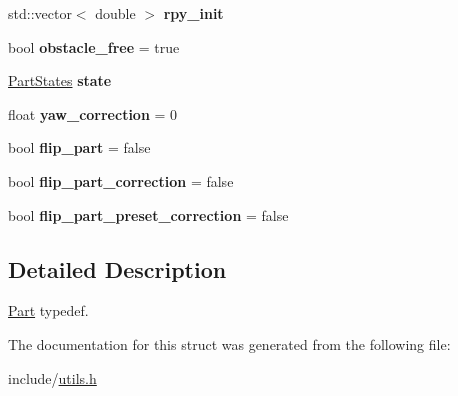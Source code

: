 \begin{DoxyCompactItemize}
\mbox{\label{structPart_a3765b86daac903e72665835d3b5d161c}} 
std\+::vector$<$ double $>$ {\bfseries rpy\+\_\+init}
\item 
\mbox{\label{structPart_a04fb40a72118482392aa85f3d32d81d7}} 
bool {\bfseries obstacle\+\_\+free} = true
\item 
\mbox{\label{structPart_a3d0424b1b6ad362298da16ada9c60959}} 
\hyperlink{utils_8h_aaf7e202ccc2e0bac6d05d124e49b11d3}{Part\+States} {\bfseries state}
\item 
\mbox{\label{structPart_a4cd35c6e6cc7bbf220efb3d44cd507ff}} 
float {\bfseries yaw\+\_\+correction} = 0
\item 
\mbox{\label{structPart_a95405a938a218baa4190e372b5ef593d}} 
bool {\bfseries flip\+\_\+part} = false
\item 
\mbox{\label{structPart_a7c9122acdff3203cfb0f21105f523051}} 
bool {\bfseries flip\+\_\+part\+\_\+correction} = false
\item 
\mbox{\label{structPart_a16632d3eccd31abb67989d5d0b3eeecb}} 
bool {\bfseries flip\+\_\+part\+\_\+preset\+\_\+correction} = false
\end{DoxyCompactItemize}


\subsection{Detailed Description}
\hyperlink{structPart}{Part} typedef. 

The documentation for this struct was generated from the following file\+:\begin{DoxyCompactItemize}
\item 
include/\hyperlink{utils_8h}{utils.\+h}\end{DoxyCompactItemize}
